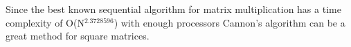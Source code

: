 Since the best known sequential algorithm for matrix multiplication has a time complexity of O(N$^{2.3728596}$) with enough processors Cannon's algorithm can be a great method for square matrices.